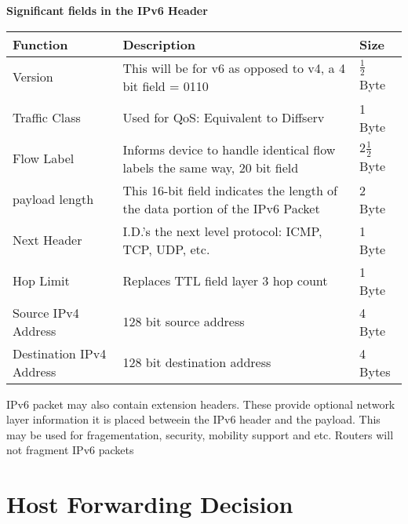 \documentclass{article}
\begin{document}
\textbf{Significant fields in the IPv6 Header}

\begin{center}
    \begin{tabular}{ |m{5cm}|m{5cm}|m{2cm}| }
        \hline
        
        Function & Description & Size \\
        \hline

        Version & This will be for v6 as opposed to v4, a 4 bit field = 0110 & $\frac{1}{2}$ Byte \\
        \hline

        Traffic Class & Used for QoS: Equivalent to Diffserv & 1 Byte\\
        \hline

        Flow Label & Informs device to handle identical flow labels the same way, 20 bit field & $2\frac{1}{2}$ Byte\\
        \hline

        payload length & This 16-bit field indicates the length of the data portion of the IPv6 Packet & 2 Byte\\
        \hline
        
        Next Header & I.D.'s the next level protocol: ICMP, TCP, UDP, etc. & 1 Byte\\
        \hline

        Hop Limit & Replaces TTL field layer 3 hop count & 1 Byte\\
        \hline
        
        Source IPv4 Address & 128 bit source address & 4 Byte\\
        \hline

        Destination IPv4 Address & 128 bit destination address & 4 Bytes\\
        \hline

    \end{tabular}
\end{center}

\begin{flushleft}
    IPv6 packet may also contain extension headers. These provide optional network layer information
    it is placed betweein the IPv6 header and the payload. This may be used for fragementation, security, mobility
    support and etc. Routers will not fragment IPv6 packets
\end{flushleft}

\section{\textbf{Host Forwarding Decision}}
\end{document}
